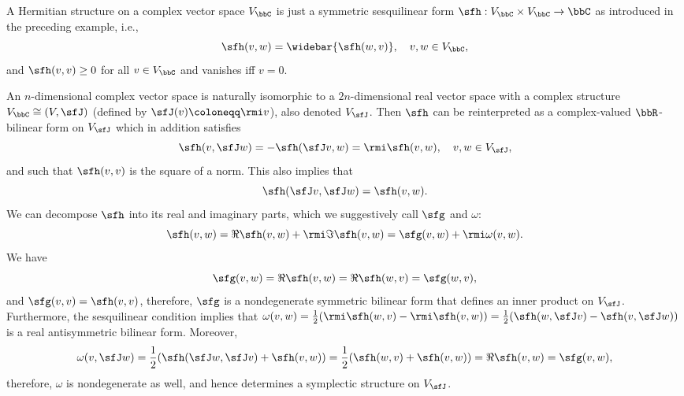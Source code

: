 \begin{example}\label{ex hermitian structures}
    A Hermitian structure on a complex vector space $V_\bbC$ is just a symmetric sesquilinear form $\sfh:V_\bbC\times V_\bbC\to \bbC$ as introduced in the preceding example, i.e.,
    \[\sfh(v,w)=\widebar{{\sfh}(w,v)},\quad v,w\in V_\bbC,\]
    and $\sfh(v,v)\geq 0$ for all $v\in V_\bbC$ and vanishes iff $v=0$.
    
    An $n$-dimensional complex vector space is naturally isomorphic to a $2n$-dimensional real vector space with a complex structure $V_\bbC\cong (V,\sfJ)$ (defined by $\sfJ(v)\coloneqq \rmi v$), also denoted $V_\sfJ$. Then $\sfh$ can be reinterpreted as a complex-valued $\bbR$-bilinear form on $V_\sfJ$ which in addition satisfies
    \[\sfh(v,\sfJ w)=-\sfh(\sfJ v,w)=\rmi\sfh(v,w),\quad v,w\in V_\sfJ,\]
    and such that $\sfh(v,v)$ is the square of a norm. This also implies that
    \[\sfh(\sfJ v,\sfJ w)=\sfh(v,w).\]
    We can decompose $\sfh$ into its real and imaginary parts, which we suggestively call $\sfg$ and $\omega$:
    \[\sfh(v,w)=\Re \sfh(v,w)+\rmi\Im\sfh(v,w)=\sfg(v,w)+\rmi \omega(v,w).\]
    We have
    \[\sfg(v,w)=\Re \sfh(v,w)=\Re \sfh(w,v)=\sfg(w,v),\]
    and $\sfg(v,v)=\sfh(v,v)$, therefore, $\sfg$ is a nondegenerate symmetric bilinear form that defines an inner product on $V_\sfJ$.
    Furthermore, the sesquilinear condition implies that 
    $\omega(v,w)=\frac12 (\rmi\sfh(w,v)-\rmi\sfh(v,w))=\frac12 (\sfh(w,\sfJ v)-\sfh(v,\sfJ w))$
    is a real antisymmetric bilinear form. 
    Moreover,
    \[\omega(v,\sfJ w)=\frac12 (\sfh(\sfJ w,\sfJ v)+\sfh(v,w))=\frac12 (\sfh(w,v)+\sfh(v,w))=\Re \sfh(v,w)=\sfg(v,w),\]
    therefore, $\omega$ is nondegenerate as well, and hence determines a symplectic structure on $V_\sfJ$. 


\end{example}
